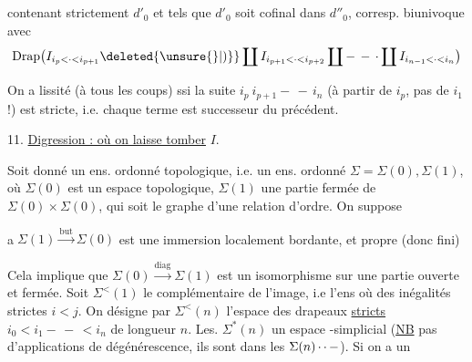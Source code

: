 \noindent\begin{minipage}{\linewidth}
\leavevmode{}
\\
\\
\end{minipage}

 contenant  strictement $d'_0$ et tels que $d'_0$ soit cofinal dans $d''_0$,   corresp. biunivoque avec
\[
\operatorname{Drap}\bigl(I_{i_p<\cdot<i_{p+1}}\deleted{\unsure{\}|)}}\coprod I_{i_{p+1}<\cdot<i_{p+2}}\coprod\mathinner{-\,-\,\cdot}\coprod I_{i_{n-1}<\cdot<i_n}\bigr)
\]

On a lissité (à tous les coups) ssi  la suite $i_p\ i_{p+1}-\, -\,i_n$ (à partir de $i_p$, pas de $i_1$ !) est stricte, i.e. chaque terme  est successeur  du précédent.

11. \uline{Digression : où on laisse tomber} $I$.

Soit donné un ens. ordonné topologique, i.e. un  ens. ordonné $\Sigma=\Sigma(0),\Sigma(1)$, où $\Sigma(0)$ est un espace topologique, $\Sigma(1)$ une partie fermée de $\Sigma(0)\times\Sigma(0)$, qui soit le graphe d'une relation d'ordre. On suppose

\textcircled{a}\quad $\Sigma(1)\xrightarrow{\mathrm{but}}\Sigma(0)$ est une immersion localement bordante, et propre (donc fini)

 Cela implique que $\Sigma(0)\xrightarrow{\mathrm{diag}}\Sigma(1)$ est un isomorphisme sur une partie ouverte et fermée. Soit $\Sigma^{<}(1)$ le complémentaire de l'image, i.e l'ens où  des inégalités strictes $i<j$. On désigne par $\Sigma^{<}(n)$ l'espace des drapeaux \uline{stricts} $i_0<i_1-\, -\,<i_n$ de longueur $n$. Les. $\Sigma^*(n)$   un espace -simplicial (\uline{NB} pas d'applications de dégénérescence,  ils sont dans les $\Sigma(n)\mathinner{\cdotp\cdotp-}$).  Si on a un

